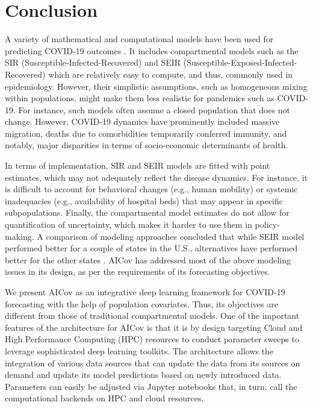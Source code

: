 \documentclass[letterpaper, inpress]{jds} %
\renewcommand{\_}{%
    \textunderscore\hspace{0pt}%
}
\begin{document}
\section{Conclusion}

A variety of mathematical and computational models have been used for
predicting COVID-19 outcomes \citep{Jewell}. It includes compartmental
models such as the SIR (Susceptible-Infected-Recovered) and SEIR
(Susceptible-Exposed-Infected-Recovered) which are relatively easy to
compute, and thus, commonly used in epidemiology. However, their
simplistic assumptions, such as homogeneous mixing within populations,
might make them less realistic for pandemics such as COVID-19. For
instance, such models often assume a closed population that does not
change. However, COVID-19 dynamics have prominently included massive
migration, deaths due to comorbidities temporarily conferred immunity,
and notably, major disparities in terms of socio-economic determinants
of health.

In terms of implementation, SIR and SEIR models are fitted with point
estimates, which may not adequately reflect the disease dynamics. For
instance, it is difficult to account for behavioral changes (e.g.,
human mobility) or systemic inadequacies (e.g., availability of
hospital beds) that may appear in specific subpopulations. Finally,
the compartmental model estimates do not allow for quantification of
uncertainty, which makes it harder to use them in policy-making. A
comparison of modeling approaches concluded that while SEIR model
performed better for a couple of states in the U.S., alternatives have
performed better for the other states \citep{Bertozzi}. AICov has
addressed most of the above modeling issues in its design, as per the
requirements of its forecasting objectives.

We present AICov as an integrative deep learning framework for
COVID-19 forecasting with the help of population covariates. Thus, its
objectives are different from those of traditional compartmental
models. One of the important features of the architecture for AICov is
that it is by design targeting Cloud and High Performance Computing
(HPC) resources to conduct parameter sweeps to leverage sophisticated
deep learning toolkits. The architecture allows the integration of
various data sources that can update the data from its sources on
demand and update its model predictions based on newly introduced
data. Parameters can easily be adjusted via Jupyter notebooks that, in
turn, call the computational backends on HPC and cloud resources.
\end{document}
